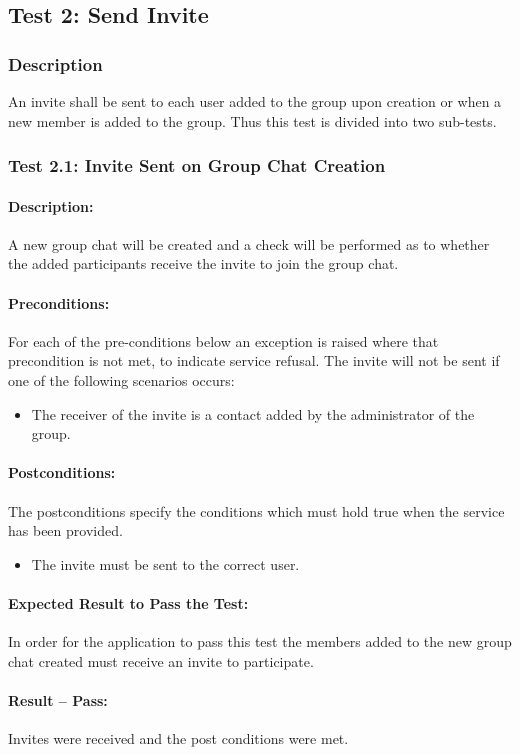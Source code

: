 \documentclass[11pt]{article}
\begin{document}
\subsection{Test 2: Send Invite}
\subsubsection{Description}
An invite shall be sent to each user added to the group upon creation or when a new member is added to the group. Thus this test is divided into two sub-tests.

\subsubsection{Test 2.1: Invite Sent on Group Chat Creation}
\paragraph{Description:}
 A new group chat will be created and a check will be performed as to whether the added participants receive the invite to join the group chat.
 \paragraph{Preconditions:}
 For each of the pre-conditions below an exception is raised where that precondition is not met, to indicate service refusal.
 The invite will not be sent if one of the following scenarios occurs:
 \begin{itemize}
 \item The receiver of the invite is a contact added by the administrator of the group.
 \end{itemize}
 \paragraph{Postconditions:} The postconditions specify the conditions which must hold true when the service has been provided.
 \begin{itemize}
 \item The invite must be sent to the correct user.
 \end{itemize}
\paragraph{Expected Result to Pass the Test:}
In order for the application to pass this test the members added to the new group chat created must receive an invite to participate.
\paragraph{Result -- Pass:}
Invites were received and the post conditions were met.
\end{document}
